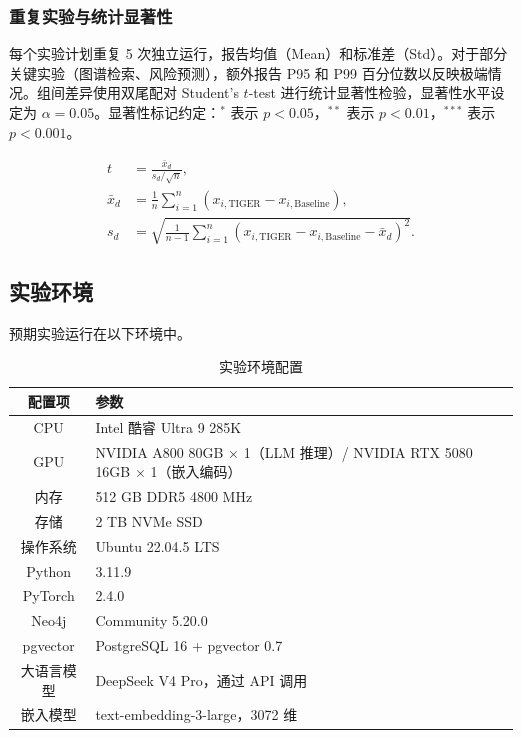 \subsubsection{重复实验与统计显著性}

每个实验计划重复 5 次独立运行，报告均值（Mean）和标准差（Std）。对于部分关键实验（图谱检索、风险预测），额外报告 P95 和 P99 百分位数以反映极端情况。组间差异使用双尾配对 Student's $t$-test 进行统计显著性检验，显著性水平设定为 $\alpha=0.05$。显著性标记约定：$^{\ast}$ 表示 $p < 0.05$，$^{\ast\ast}$ 表示 $p < 0.01$，$^{\ast\ast\ast}$ 表示 $p < 0.001$。

\begin{align}
t &= \frac{\bar{x}_d}{s_d / \sqrt{n}}, \\[0.3em]
\bar{x}_d &= \frac{1}{n}\sum_{i=1}^{n}(x_{i,\text{TIGER}} - x_{i,\text{Baseline}}), \\[0.3em]
s_d &= \sqrt{\frac{1}{n-1}\sum_{i=1}^{n}(x_{i,\text{TIGER}} - x_{i,\text{Baseline}} - \bar{x}_d)^2}.
\end{align}

\subsection{实验环境}
\label{sec:exp-env}

预期实验运行在以下环境中。

\begin{table}[H]
\centering
\footnotesize
\caption{实验环境配置}
\label{tab:exp-env}
\begin{tabularx}{0.95\linewidth}{c X}
\toprule
\textbf{配置项} & \textbf{参数} \\
\midrule
CPU & Intel 酷睿 Ultra 9 285K \\
GPU & NVIDIA A800 80GB $\times$ 1（LLM 推理）/ NVIDIA RTX 5080 16GB $\times$ 1（嵌入编码） \\
内存 & 512 GB DDR5 4800 MHz \\
存储 & 2 TB NVMe SSD \\
操作系统 & Ubuntu 22.04.5 LTS \\
Python & 3.11.9 \\
PyTorch & 2.4.0 \\
Neo4j & Community 5.20.0 \\
pgvector & PostgreSQL 16 + pgvector 0.7 \\
大语言模型 & DeepSeek V4 Pro，通过 API 调用 \\
嵌入模型 & text-embedding-3-large，3072 维 \\
\bottomrule
\end{tabularx}
\end{table}

